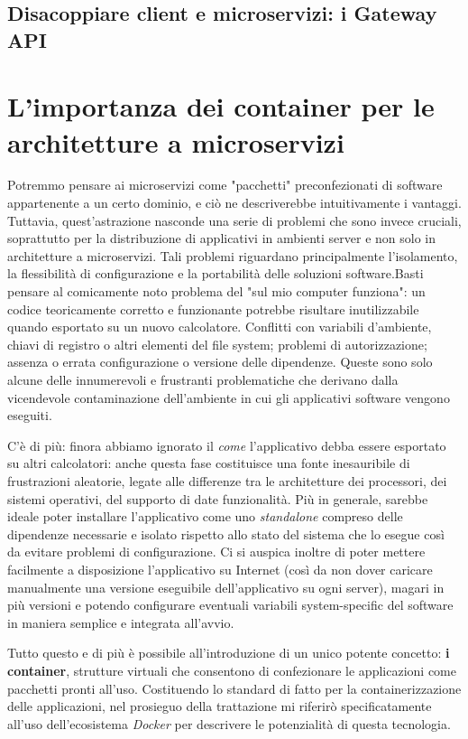 \subsection{Disacoppiare client e microservizi: i Gateway API}


\section{L'importanza dei container per le architetture a microservizi}
Potremmo pensare ai microservizi come "pacchetti" preconfezionati di software appartenente a un certo dominio, e ciò ne descriverebbe intuitivamente i vantaggi. Tuttavia, quest'astrazione nasconde una serie di problemi che sono invece cruciali, soprattutto per la distribuzione di applicativi in ambienti server e non solo in architetture a microservizi.
Tali problemi riguardano principalmente l'isolamento, la flessibilità di configurazione e la portabilità delle soluzioni software.Basti pensare al comicamente noto problema del "sul mio computer funziona": un codice teoricamente corretto e funzionante potrebbe risultare inutilizzabile quando esportato su un nuovo calcolatore.
Conflitti con variabili d'ambiente, chiavi di registro o altri elementi del file system; problemi di autorizzazione; assenza o errata configurazione o versione delle dipendenze. Queste sono solo alcune delle innumerevoli e frustranti problematiche che derivano dalla vicendevole contaminazione dell'ambiente in cui gli applicativi software vengono eseguiti.

C'è di più: finora abbiamo ignorato il \emph{come} l'applicativo debba essere esportato su altri calcolatori: anche questa fase costituisce una fonte inesauribile di frustrazioni aleatorie, legate alle differenze tra le architetture dei processori, dei sistemi operativi, del supporto di date funzionalità. Più in generale, sarebbe ideale poter installare l'applicativo come uno \emph{standalone} compreso delle dipendenze necessarie e isolato rispetto allo stato del sistema che lo esegue così da evitare problemi di configurazione. Ci si auspica inoltre di poter mettere facilmente a disposizione l'applicativo su Internet (così da non dover caricare manualmente una versione eseguibile dell'applicativo su ogni server), magari in più versioni e potendo configurare eventuali variabili system-specific del software in maniera semplice e integrata all'avvio.

Tutto questo e di più è possibile all'introduzione di un unico potente concetto: \textbf{i container}, strutture virtuali che consentono di confezionare le applicazioni come pacchetti pronti all'uso.
Costituendo lo standard di fatto per la containerizzazione delle applicazioni, nel prosieguo della trattazione mi riferirò specificatamente all'uso dell'ecosistema \emph{Docker} per descrivere le potenzialità di questa tecnologia.

